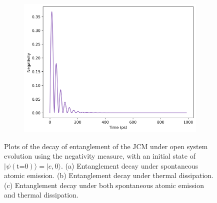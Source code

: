 \documentclass[11pt]{article}
\begin{document}
\begin{figure}[H]
    \vspace{0.5cm}
    
    \begin{subfigure}{0.45\textwidth}
        \centering
        \includegraphics[width=\linewidth]{Research Project/Code/results/JCM/OQS_Neg_Both.png}
        \caption{}
        \label{fig:JCM_OQS_Neg_Both}
    \end{subfigure}
    \hfill
    \caption{Plots of the decay of entanglement of the JCM under open system evolution using the negativity measure, with an initial state of $|\psi (\text{t=0})\rangle = |e, 0\rangle$. (a) Entanglement decay under spontaneous atomic emission. (b) Entanglement decay under thermal dissipation. (c) Entanglement decay under both spontaneous atomic emission and thermal dissipation.}
    \label{fig:JCM_OQS_Neg}
\end{figure}
\end{document}
